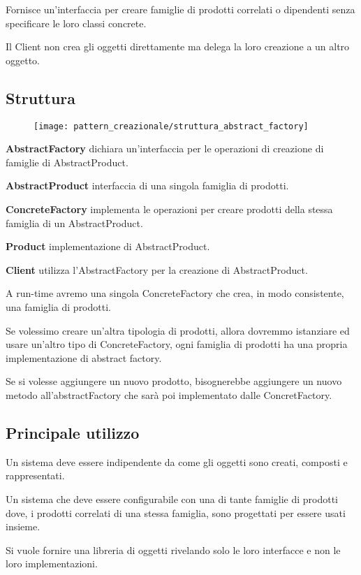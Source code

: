 Fornisce un’interfaccia per creare famiglie di prodotti correlati o dipendenti senza specificare le loro classi concrete.

Il Client non crea gli oggetti direttamente ma delega la loro creazione a un altro oggetto.

\subsection{Struttura}

\begin{figure}[H]
    \centering
    \texttt{[image: pattern\_creazionale/struttura\_abstract\_factory]}
\end{figure}

\textbf{AbstractFactory} dichiara un’interfaccia per le operazioni di creazione di famiglie di AbstractProduct.

\textbf{AbstractProduct} interfaccia di una singola famiglia di prodotti.

\textbf{ConcreteFactory} implementa le operazioni per creare prodotti della stessa famiglia di un AbstractProduct.

\textbf{Product} implementazione di AbstractProduct.

\textbf{Client} utilizza l'AbstractFactory per la creazione di AbstractProduct.
\medskip

A run-time avremo una singola ConcreteFactory che crea, in modo consistente, una famiglia di prodotti.

Se volessimo creare un'altra tipologia di prodotti, allora dovremmo istanziare ed usare un'altro tipo di ConcreteFactory, ogni famiglia di prodotti ha una propria 
implementazione di abstract factory.

Se si volesse aggiungere un nuovo prodotto, bisognerebbe aggiungere un nuovo metodo all'abstractFactory che sarà poi implementato dalle ConcretFactory.

\subsection{Principale utilizzo}

Un sistema deve essere indipendente da come gli oggetti sono creati, composti e rappresentati.

Un sistema che deve essere configurabile con una di tante famiglie di prodotti dove, i prodotti correlati di una stessa famiglia, sono progettati per essere usati 
insieme.

Si vuole fornire una libreria di oggetti rivelando solo le loro interfacce e non le loro implementazioni.

